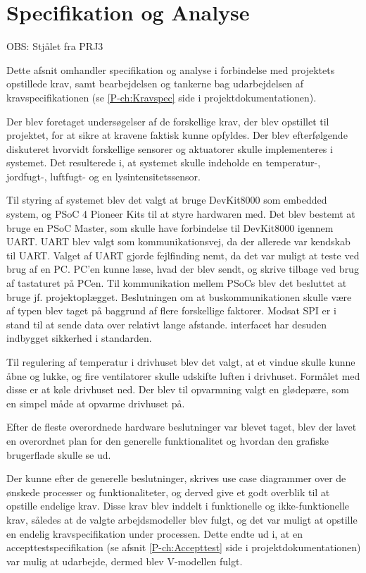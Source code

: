 \section{Specifikation og Analyse}
\label{ch:Specifikation_og_Analyse}

OBS: Stjålet fra PRJ3

Dette afsnit omhandler specifikation og analyse i forbindelse med projektets opstillede krav, samt bearbejdelsen og tankerne bag udarbejdelsen af kravspecifikationen (se \ref{P-ch:Kravspec}  side \pageref{P-ch:Kravspec} i projektdokumentationen).

\mbox{}

Der blev foretaget undersøgelser af de forskellige krav, der blev opstillet til projektet, for at sikre at kravene faktisk kunne opfyldes. Der blev efterfølgende diskuteret hvorvidt forskellige sensorer og aktuatorer skulle implementeres i systemet. Det resulterede i, at systemet skulle indeholde en temperatur-, jordfugt-, luftfugt- og en lysintensitetssensor.

Til styring af systemet blev det valgt at bruge DevKit8000 som embedded system, og PSoC 4 Pioneer Kits til at styre hardwaren med. Det blev bestemt at bruge en PSoC Master, som skulle have forbindelse til DevKit8000 igennem UART. UART blev valgt som kommunikationsvej, da der allerede var kendskab til UART. Valget af UART gjorde fejlfinding nemt, da det var muligt at teste ved brug af en PC. PC'en kunne læse, hvad der blev sendt, og skrive tilbage ved brug af tastaturet på PCen.
Til kommunikation mellem PSoCs blev det besluttet at bruge \IIC jf. projektoplægget.
Beslutningen om at buskommunikationen skulle være af typen \IIC blev taget på baggrund af flere forskellige faktorer. Modsat SPI er \IIC i stand til at sende data over relativt lange afstande. \IIC interfacet har desuden indbygget sikkerhed i standarden.

Til regulering af temperatur i drivhuset blev det valgt, at et vindue skulle kunne åbne og lukke, og fire ventilatorer skulle udskifte luften i drivhuset. Formålet med disse er at køle drivhuset ned. Der blev til opvarmning valgt en glødepære, som en simpel måde at opvarme drivhuset på.

Efter de fleste overordnede hardware beslutninger var blevet taget, blev der lavet en overordnet plan for den generelle funktionalitet og hvordan den grafiske brugerflade skulle se ud.

Der kunne efter de generelle beslutninger, skrives use case diagrammer over de ønskede processer og funktionaliteter, og derved give et godt overblik til at opstille endelige krav. Disse krav blev inddelt i funktionelle og ikke-funktionelle krav, således at de valgte arbejdsmodeller blev fulgt, og det var muligt at opstille en endelig kravspecifikation under processen. Dette endte ud i, at en accepttestspecifikation (se afsnit \ref{P-ch:Accepttest}  side \pageref{P-ch:Accepttest} i projektdokumentationen) var mulig at udarbejde, dermed blev V-modellen fulgt.

\clearpage